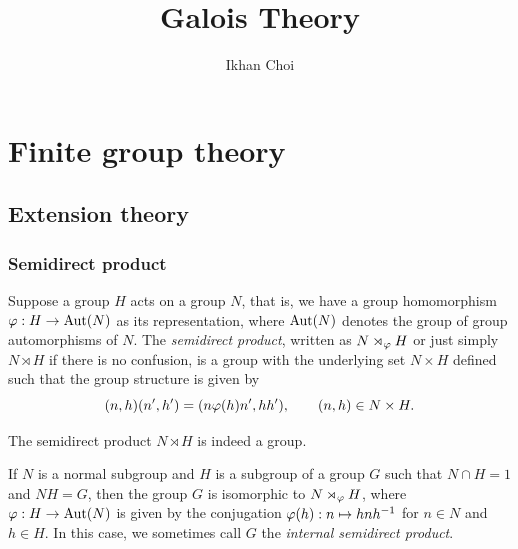 \documentclass{../../large}
\begin{document}
\title{Galois Theory}
\author{Ikhan Choi}
\maketitle
\tableofcontents

\part{Finite group theory}

\chapter{Extension theory}


\section{Semidirect product}


\begin{prb}
Suppose a group $H$ acts on a group $N$, that is, we have a group homomorphism $\varphi:H\to\operatorname{Aut}(N)$ as its representation, where $\operatorname{Aut}(N)$ denotes the group of group automorphisms of $N$.
The \emph{semidirect product}, written as $N\rtimes_\varphi H$ or just simply $N\rtimes H$ if there is no confusion, is a group with the underlying set $N\times H$ defined such that the group structure is given by
\[(n,h)(n',h')=(n\varphi(h)n',hh'),\qquad(n,h)\in N\times H.\]
\begin{parts}
\item The semidirect product $N\rtimes H$ is indeed a group.
\item If $N$ is a normal subgroup and $H$ is a subgroup of a group $G$ such that $N\cap H=1$ and $NH=G$, then the group $G$ is isomorphic to $N\rtimes_\varphi H$, where $\varphi:H\to\operatorname{Aut}(N)$ is given by the conjugation $\varphi(h):n\mapsto hnh^{-1}$ for $n\in N$ and $h\in H$.
In this case, we sometimes call $G$ the \emph{internal semidirect product}.
\end{parts}
\end{prb}
\end{document}

